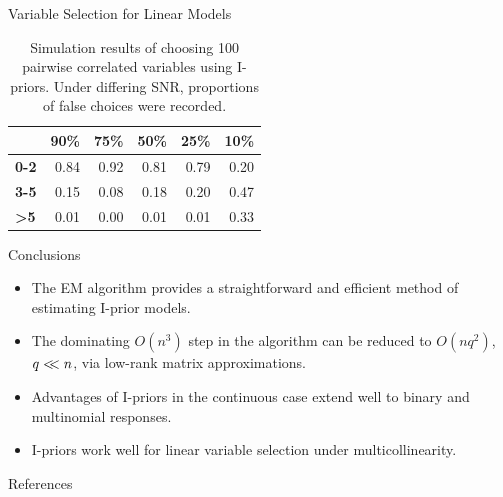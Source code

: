 \documentclass{beamer}
\newlength{\onecolwid}
\begin{document}
\begin{frame}[t]
\begin{columns}[t]
\begin{column}{\onecolwid}
\begin{block}{Variable Selection for Linear Models}
\begin{table}
\begin{tabular}{l r r r r r}
  & \hspace{0.5cm} \textbf{90\%} 
  & \hspace{0.5cm} \textbf{75\%} 
  & \hspace{0.5cm} \textbf{50\%} 
  & \hspace{0.5cm} \textbf{25\%} 
  & \hspace{0.5cm} \textbf{10\%} \\
  \midrule
  \textbf{0-2}  & 0.84 & 0.92 & 0.81 & 0.79 & 0.20 \\
  \textbf{3-5}  & 0.15 & 0.08 & 0.18 & 0.20 & 0.47 \\
  \textbf{>5} & 0.01 & 0.00 & 0.01 & 0.01 & 0.33 \\
  \bottomrule
  \end{tabular}
  \caption{Simulation results of choosing 100 pairwise correlated variables using I-priors. Under differing SNR, proportions of false choices were recorded.}
\end{table}  

\end{block}




\begin{alertblock}{Conclusions}

\begin{itemize}
  \item The EM algorithm provides a straightforward and efficient method of estimating I-prior models.
  \item The dominating $O(n^3)$ step in the algorithm can be reduced to $O(nq^2)$, $q <\!\!< n$, via low-rank matrix approximations.
  \item Advantages of I-priors in the continuous case extend well to binary and multinomial responses.
  \item I-priors work well for linear variable selection under multicollinearity.
\end{itemize}

\end{alertblock}



\begin{block}{References}


\end{block}
\end{column}
\end{columns}
\end{frame}
\end{document}
